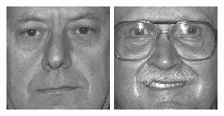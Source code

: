 \begin{figure}[ht]
\begin{center}
  \includegraphics[width=\columnwidth/10]{ch5/figures/feret5.jpg}
  \includegraphics[width=\columnwidth/10]{ch5/figures/feret6.jpg}\\

\end{center}
\end{figure}
